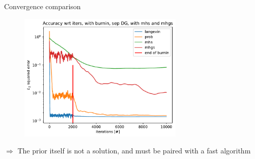 \documentclass{beamer}
\begin{document}
\begin{frame}{Convergence comparison}
    \begin{figure}[H]
            \centering
            \includegraphics[width=0.7\textwidth]{figures/experiments/mhs_mhgs/iters_acc_comp_iters_no_avg_sep_prob_pl_mhs_mhgs-1.png}
        
        \end{figure}
        $\Longrightarrow$ The prior itself is not a solution, and must be paired with a fast algorithm
\end{frame}
\end{document}
